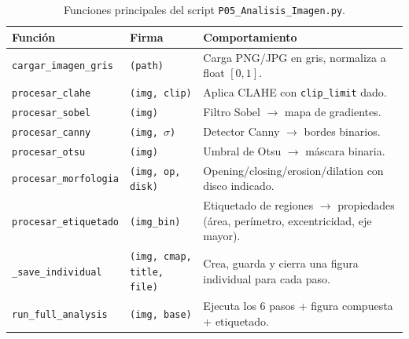 \documentclass[12pt,a4paper]{article}
\begin{document}
\begin{table}[H]
	\centering
	\caption{Funciones principales del script \texttt{P05\_Analisis\_Imagen.py}.}
	\label{tab:funciones}
	\small
	\begin{tabularx}{\textwidth}{l l X}
		\toprule
		\textbf{Función} & \textbf{Firma}                                              & \textbf{Comportamiento} \\
		\midrule
		\texttt{cargar\_imagen\_gris}
		                 & \texttt{(path)}
		                 & Carga PNG/JPG en gris, normaliza a float $[0,1]$.                                     \\
		\texttt{procesar\_clahe}
		                 & \texttt{(img, clip)}
		                 & Aplica CLAHE con \texttt{clip\_limit} dado.                                           \\
		\texttt{procesar\_sobel}
		                 & \texttt{(img)}
		                 & Filtro Sobel $\to$ mapa de gradientes.                                                \\
		\texttt{procesar\_canny}
		                 & \texttt{(img, $\sigma$)}
		                 & Detector Canny $\to$ bordes binarios.                                                 \\
		\texttt{procesar\_otsu}
		                 & \texttt{(img)}
		                 & Umbral de Otsu $\to$ máscara binaria.                                                 \\
		\texttt{procesar\_morfologia}
		                 & \texttt{(img, op, disk)}
		                 & Opening/closing/erosion/dilation con disco indicado.                                  \\
		\texttt{procesar\_etiquetado}
		                 & \texttt{(img\_bin)}
		                 & Etiquetado de regiones $\to$ propiedades (área, perímetro,
		excentricidad, eje mayor).                                                                               \\
		\texttt{\_save\_individual}
		                 & \texttt{(img, cmap, title, file)}
		                 & Crea, guarda y cierra una figura individual para cada paso.                           \\
		\texttt{run\_full\_analysis}
		                 & \texttt{(img, base)}
		                 & Ejecuta los 6 pasos + figura compuesta + etiquetado.                                  \\
		\bottomrule
	\end{tabularx}
\end{table}
\end{document}

